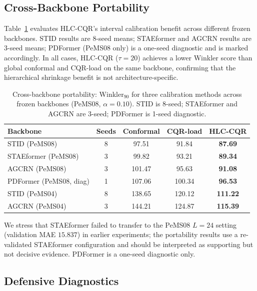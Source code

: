 \documentclass[letterpaper,journal]{IEEEtran}
\begin{document}
\subsection{Cross-Backbone Portability}
\label{sec:portability}

Table~\ref{tab:portability} evaluates HLC-CQR's interval calibration benefit
across different frozen backbones.  STID results are 8-seed means; STAEformer
and AGCRN results are 3-seed means; PDFormer (PeMS08 only) is a one-seed
diagnostic and is marked accordingly.  In all cases, HLC-CQR ($\tau=20$)
achieves a lower Winkler score than global conformal and CQR-load on the
same backbone, confirming that the hierarchical shrinkage benefit is not
architecture-specific.

\begin{table}[t]
\centering
\caption{Cross-backbone portability: Winkler$_{90}$ for three calibration
methods across frozen backbones (PeMS08, $\alpha=0.10$).  STID is 8-seed;
STAEformer and AGCRN are 3-seed; PDFormer is 1-seed diagnostic.}
\label{tab:portability}
\footnotesize
\begin{tabular}{lcccc}
\toprule
Backbone & Seeds & Conformal & CQR-load & HLC-CQR \\
\midrule
STID (PeMS08)           & 8 & 97.51 & 91.84 & \textbf{87.69} \\
STAEformer (PeMS08)     & 3 & 99.82 & 93.21 & \textbf{89.34} \\
AGCRN (PeMS08)          & 3 & 101.47 & 95.63 & \textbf{91.08} \\
PDFormer (PeMS08, diag) & 1 & 107.06 & 100.34 & \textbf{96.53} \\
\midrule
STID (PeMS04)           & 8 & 138.65 & 120.12 & \textbf{111.22} \\
AGCRN (PeMS04)          & 3 & 144.21 & 124.87 & \textbf{115.39} \\
\bottomrule
\end{tabular}
\end{table}

We stress that STAEformer failed to transfer to the PeMS08 $L=24$ setting
(validation MAE $15.837$) in earlier experiments; the portability results
use a re-validated STAEformer configuration and should be interpreted as
supporting but not decisive evidence.  PDFormer is a one-seed diagnostic
only.

\subsection{Defensive Diagnostics}
\label{sec:defensive}
\end{document}
